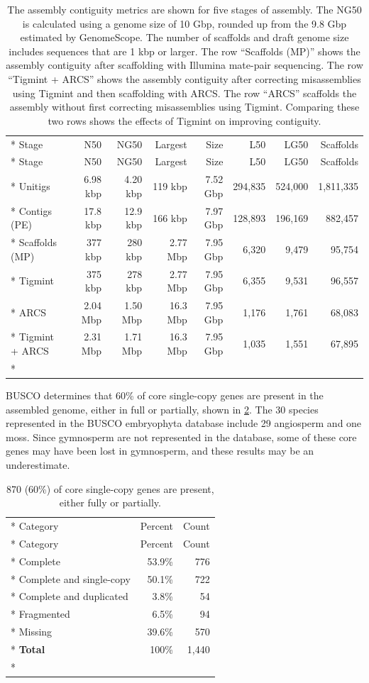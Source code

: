 \documentclass[
  12pt,
  oneside,
  openany]{book}
\begin{document}
\hypertarget{tbl:contiguity}{}
\begin{singlespace}
\small
\begin{longtable}[]{@{}lrrrrrrr@{}}
\caption[The assembly contiguity metrics are shown for five stages of assembly.]{\label{tbl:contiguity}The assembly contiguity metrics are shown for five stages of assembly. The NG50 is calculated using a genome size of 10 Gbp, rounded up from the 9.8 Gbp estimated by GenomeScope. The number of scaffolds and draft genome size includes sequences that are 1 kbp or larger. The row ``Scaffolds (MP)'' shows the assembly contiguity after scaffolding with Illumina mate-pair sequencing. The row ``Tigmint + ARCS'' shows the assembly contiguity after correcting misassemblies using Tigmint and then scaffolding with ARCS. The row ``ARCS'' scaffolds the assembly without first correcting misassemblies using Tigmint. Comparing these two rows shows the effects of Tigmint on improving contiguity.}\tabularnewline*
\toprule
Stage & N50 & NG50 & Largest & Size & L50 & LG50 & Scaffolds\tabularnewline*
\midrule
\endfirsthead
\toprule
Stage & N50 & NG50 & Largest & Size & L50 & LG50 & Scaffolds\tabularnewline*
\midrule
\endhead
Unitigs & 6.98 kbp & 4.20 kbp & 119 kbp & 7.52 Gbp & 294,835 & 524,000 & 1,811,335\tabularnewline*
Contigs (PE) & 17.8 kbp & 12.9 kbp & 166 kbp & 7.97 Gbp & 128,893 & 196,169 & 882,457\tabularnewline*
Scaffolds (MP) & 377 kbp & 280 kbp & 2.77 Mbp & 7.95 Gbp & 6,320 & 9,479 & 95,754\tabularnewline*
Tigmint & 375 kbp & 278 kbp & 2.77 Mbp & 7.95 Gbp & 6,355 & 9,531 & 96,557\tabularnewline*
ARCS & 2.04 Mbp & 1.50 Mbp & 16.3 Mbp & 7.95 Gbp & 1,176 & 1,761 & 68,083\tabularnewline*
Tigmint + ARCS & 2.31 Mbp & 1.71 Mbp & 16.3 Mbp & 7.95 Gbp & 1,035 & 1,551 & 67,895\tabularnewline*
\bottomrule
\end{longtable}
\end{singlespace}

BUSCO determines that 60\% of core single-copy genes are present in the assembled genome, either in full or partially, shown in \cref{tbl:busco}. The 30 species represented in the BUSCO embryophyta database include 29 angiosperm and one moss. Since gymnosperm are not represented in the database, some of these core genes may have been lost in gymnosperm, and these results may be an underestimate.

\hypertarget{tbl:busco}{}
\begin{singlespace}
\small
\begin{longtable}[]{@{}lrr@{}}
\caption[870 (60\%) of core single-copy genes are present, either fully or partially.]{\label{tbl:busco}870 (60\%) of core single-copy genes are present, either fully or partially.}\tabularnewline*
\toprule
Category & Percent & Count\tabularnewline*
\midrule
\endfirsthead
\toprule
Category & Percent & Count\tabularnewline*
\midrule
\endhead
Complete & 53.9\% & 776\tabularnewline*
Complete and single-copy & 50.1\% & 722\tabularnewline*
Complete and duplicated & 3.8\% & 54\tabularnewline*
Fragmented & 6.5\% & 94\tabularnewline*
Missing & 39.6\% & 570\tabularnewline*
\textbf{Total} & 100\% & 1,440\tabularnewline*
\bottomrule
\end{longtable}
\end{singlespace}
\end{document}
